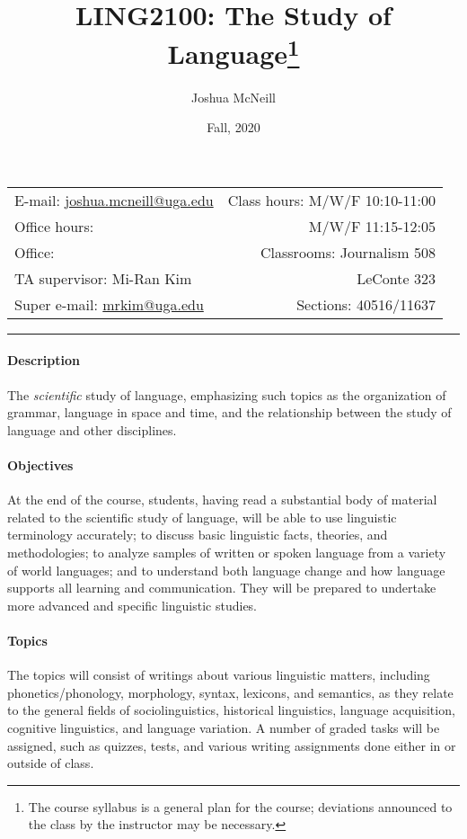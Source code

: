 \documentclass{article}
\title{LING2100: The Study of Language\footnote{The course syllabus is a general plan for the course; deviations announced to the class by the instructor may be necessary.}}
\author{Joshua McNeill}
\date{Fall, 2020}
\begin{document}
  \maketitle

  \begin{center}
    \begin{tabular}{@{} l r @{}}
      E-mail: \url{joshua.mcneill@uga.edu}              & Class hours: M/W/F 10:10-11:00\\
      Office hours:   & M/W/F 11:15-12:05\\
      Office:      & Classrooms: Journalism 508\\
      TA supervisor: Mi-Ran Kim                         & LeConte 323\\
      Super e-mail: \url{mrkim@uga.edu}                 & Sections: 40516/11637
    \end{tabular}
  \end{center}

  \hrule

  \paragraph{Description}
    The \emph{scientific} study of language, emphasizing such topics as the organization of grammar, language in space and time, and the relationship between the study of language and other disciplines.

  \paragraph{Objectives}
    At the end of the course, students, having read a substantial body of material related to the scientific study of language, will be able to use linguistic terminology accurately; to discuss basic linguistic facts, theories, and methodologies; to analyze samples of written or spoken language from a variety of world languages; and to understand both language change and how language supports all learning and communication. They will be prepared to undertake more advanced and specific linguistic studies.

  \paragraph{Topics}
    The topics will consist of writings about various linguistic matters, including phonetics/phonology, morphology, syntax, lexicons, and semantics, as they relate to the general fields of sociolinguistics, historical linguistics, language acquisition, cognitive linguistics, and language variation. A number of graded tasks will be assigned, such as quizzes, tests, and various writing assignments done either in or outside of class.
\end{document}
